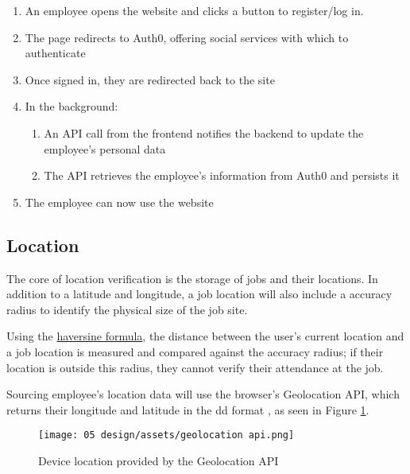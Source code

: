 \begin{enumerate}

  \item An employee opens the \projectname{} website and
        clicks a button to register/log in.

  \item The page redirects to Auth0, offering social
        services with which to authenticate

  \item Once signed in, they are redirected back to the
        \projectname{} site

  \item[{}] In the background:
    \begin{enumerate}
      \item An API call from the frontend notifies the
            backend to update the employee's
            personal data

      \item The API retrieves the employee's
            information from Auth0 and persists it
    \end{enumerate}

  \item The employee can now use the website
\end{enumerate}


\subsection{Location}

The core of location verification is the storage of jobs
and their locations.
In addition to a latitude and longitude, a job location
will also include a accuracy radius to identify the
physical size of the job site.

Using the \hyperref[ss:coordSystems]{haversine formula},
the distance between the user's current location and a job
location is measured and compared against the accuracy
radius; if their location is outside this radius, they
cannot verify their attendance at the job.

Sourcing employee's location data will use the browser's
Geolocation API, which returns their longitude and latitude
in the \gls{dd} format \parencite{geolocationApi}, as seen
in Figure \ref{fig:geolocationApi}.

\begin{figure}[h]
  \centering
  \texttt{[image: 05
    design/assets/geolocation api.png]}
  \caption{Device location provided by the Geolocation API}
  \label{fig:geolocationApi}
  \parencite{geolocationApi}
\end{figure}

